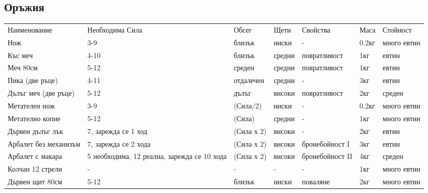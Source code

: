 \subsection{Оръжия}
\begin{tabular}{p{2cm} | p{2cm} | p{2cm} | p{2cm} | p{2cm} | p{2cm} | p{2cm}}
Наименование          & Необходима Сила      & Обсег      & Щети       & Свойства       & Маса  & Стойност         \\
Нож                   & 3-9                  & близък     & ниски      & -              & 0.2кг & много евтин  \\
Къс меч               & 4-10                 & близък     & средни     & повратливост   & 1кг   & евтин        \\
Меч 80см              & 5-12                 & среден     & средни     & повратливост   & 1кг   & евтин        \\

Пика (две ръце)       & 4-11                 & отдалечен  & средни     & -              & 3кг   & евтин        \\
Дълъг меч (две ръце)  & 5-12                 & дълъг      & високи     & повратливост   & 2кг   & среден       \\

Метателен нож         & 3-9                  & (Сила/2)   & ниски      & -              & 0.2кг & много евтин  \\
Метателно копие       & 5-12                 & (Сила)     & средни     & -              & 1кг   & много евтин  \\
Дървен дълъг лък      & 7, зарежда се 1 ход  & (Сила х 2) & високи     & -              & 2кг   & евтин        \\
Арбалет без механизъм & 7, зарежда се 2 хода & (Сила х 2) & високи     & бронебойност I & 3кг   & евтин        \\
Арбалет с макара      & 5 необходима, 12 реална, зарежда се 10 хода & (Сила х 2) & високи & бронебойност II & 4кг & среден\\
Колчан 12 стрели      & -                    & -          & -          & -              & 1кг   & много евтин  \\

Дървен щит 80см       & 5-12                 & близък     & ниски      & поваляне       & 2кг   & много евтин  \\
\end{tabular}


